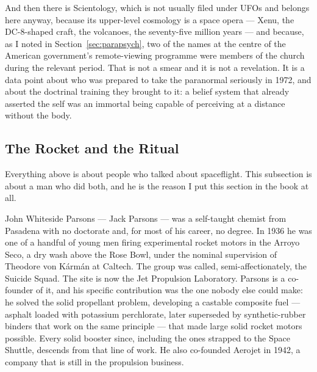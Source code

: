And then there is Scientology, which is not usually filed under UFOs and belongs here anyway,
because its upper-level cosmology is a space opera --- Xenu, the DC-8-shaped craft, the volcanoes,
the seventy-five million years --- and because, as I noted in Section~\ref{sec:parapsych}, two of the
names at the centre of the American government's remote-viewing programme were members of the
church during the relevant period. That is not a smear and it is not a revelation. It is a
data point about who was prepared to take the paranormal seriously in 1972, and about the
doctrinal training they brought to it: a belief system that already asserted the self was an
immortal being capable of perceiving at a distance without the body.

\Needspace*{0.40\textheight}
\subsection{The Rocket and the Ritual}\label{sec:parsonscrowley}

Everything above is about people who talked about spaceflight. This subsection is about a man
who did both, and he is the reason I put this section in the book at all.

John Whiteside Parsons --- Jack Parsons --- was a self-taught chemist from Pasadena with no
doctorate and, for most of his career, no degree. In 1936 he was one of a handful of young men
firing experimental rocket motors in the Arroyo Seco, a dry wash above the Rose Bowl, under the
nominal supervision of Theodore von K\'arm\'an at Caltech. The group was called, semi-affectionately,
the Suicide Squad. The site is now the Jet Propulsion Laboratory. Parsons is a co-founder of it,
and his specific contribution was the one nobody else could make: he solved the solid propellant
problem, developing a castable composite fuel --- asphalt loaded with potassium perchlorate, later
superseded by synthetic-rubber binders that work on the same principle --- that made large solid
rocket motors possible. Every solid booster since, including the ones strapped to the Space
Shuttle, descends from that line of work. He also co-founded Aerojet in 1942, a company that is
still in the propulsion business.

